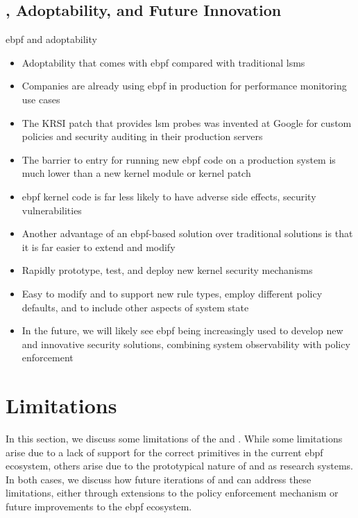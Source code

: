 \subsection{, Adoptability, and Future Innovation}

\begin{inprogress}
  \gls{ebpf} and adoptability
  \begin{itemize}
    \item Adoptability that comes with \gls{ebpf} compared with traditional \glspl{lsm}
    \item Companies are already using \gls{ebpf} in production for performance monitoring use cases
    \item The KRSI patch that provides \gls{lsm} probes was invented at Google for custom policies and security auditing in their production servers
    \item The barrier to entry for running new \gls{ebpf} code on a production system is much lower than a new kernel module or kernel patch
    \item \gls{ebpf} kernel code is far less likely to have adverse side effects, security vulnerabilities

    \item Another advantage of an \gls{ebpf}-based solution over traditional solutions is that it is far easier to extend and modify
    \item Rapidly prototype, test, and deploy new kernel security mechanisms
    \item Easy to modify \bpfbox{} and \bpfcontain{} to support new rule types, employ different policy defaults, and to include other aspects of system state
    \item In the future, we will likely see \gls{ebpf} being increasingly used to develop new and innovative security solutions, combining
    system observability with policy enforcement
  \end{itemize}
\end{inprogress}


\section{Limitations}%
\label{s:disc-limitations}

In this section, we discuss some limitations of the \bpfbox{} and \bpcontain{}.
While some limitations arise due to a lack of support for the correct primitives
in the current \gls{ebpf} ecosystem, others arise due to the prototypical nature of \bpfbox{}
and \bpfcontain{} as research systems. In both cases, we discuss how future iterations
of \bpfbox{} and \bpfcontain can address these limitations, either through extensions to
the policy enforcement mechanism or future improvements to the \gls{ebpf} ecosystem.

